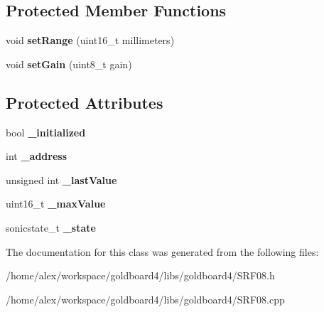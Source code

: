 \subsection*{Protected Member Functions}
\begin{DoxyCompactItemize}
\item 
void {\bfseries set\+Range} (uint16\+\_\+t millimeters)\hypertarget{class_s_r_f08_a4317b5ec7dffe3c83542961a77a59e74}{}\label{class_s_r_f08_a4317b5ec7dffe3c83542961a77a59e74}

\item 
void {\bfseries set\+Gain} (uint8\+\_\+t gain)\hypertarget{class_s_r_f08_ac02024ad486ef18868493afa8836c2a4}{}\label{class_s_r_f08_ac02024ad486ef18868493afa8836c2a4}

\end{DoxyCompactItemize}
\subsection*{Protected Attributes}
\begin{DoxyCompactItemize}
\item 
bool {\bfseries \+\_\+initialized}\hypertarget{class_s_r_f08_a296319571e91e872433fbadc5dd6c84b}{}\label{class_s_r_f08_a296319571e91e872433fbadc5dd6c84b}

\item 
int {\bfseries \+\_\+address}\hypertarget{class_s_r_f08_a853a1be73c9fc3d473dd34ee57110a6d}{}\label{class_s_r_f08_a853a1be73c9fc3d473dd34ee57110a6d}

\item 
unsigned int {\bfseries \+\_\+last\+Value}\hypertarget{class_s_r_f08_a70ed30ace7bde29bfcbf85a48ac12f43}{}\label{class_s_r_f08_a70ed30ace7bde29bfcbf85a48ac12f43}

\item 
uint16\+\_\+t {\bfseries \+\_\+max\+Value}\hypertarget{class_s_r_f08_a489d8f367d124aca63894c23c30aa4ea}{}\label{class_s_r_f08_a489d8f367d124aca63894c23c30aa4ea}

\item 
sonicstate\+\_\+t {\bfseries \+\_\+state}\hypertarget{class_s_r_f08_a4397ea316e60ffa169ee8de39b445a49}{}\label{class_s_r_f08_a4397ea316e60ffa169ee8de39b445a49}

\end{DoxyCompactItemize}


The documentation for this class was generated from the following files\+:\begin{DoxyCompactItemize}
\item 
/home/alex/workspace/goldboard4/libs/goldboard4/S\+R\+F08.\+h\item 
/home/alex/workspace/goldboard4/libs/goldboard4/S\+R\+F08.\+cpp\end{DoxyCompactItemize}
